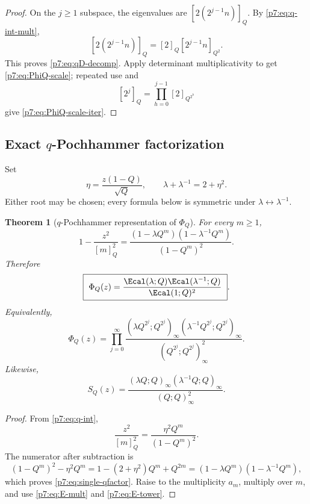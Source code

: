 \documentclass[11pt]{article}
\numberwithin{equation}{section}
\newtheorem{theorem}{Theorem}[section]
\theoremstyle{definition}
\theoremstyle{remark}
\begin{document}
\begin{proof}
On the $j\ge1$ subspace, the eigenvalues are $[2(2^{j-1}n)]_Q$.  By \cref{p7:eq:q-int-mult},
\[
 [2(2^{j-1}n)]_Q=[2]_Q[2^{j-1}n]_{Q^2}.
\]
This proves \cref{p7:eq:qD-decomp}.  Apply determinant multiplicativity to get \cref{p7:eq:PhiQ-scale}; repeated use and
\[
 [2^j]_Q=\prod_{h=0}^{j-1}[2]_{Q^{2^h}}
\]
give \cref{p7:eq:PhiQ-scale-iter}.
\end{proof}

\subsection{Exact $q$-Pochhammer factorization}

Set
\begin{equation}\label{p7:eq:eta-lambda}
 \eta=\frac{z(1-Q)}{\sqrt Q},
 \qquad
 \lambda+\lambda^{-1}=2+\eta^2.
\end{equation}
Either root may be chosen; every formula below is symmetric under $\lambda\leftrightarrow\lambda^{-1}$.

\begin{theorem}[$q$-Pochhammer representation of $\Phi_Q$]\label{p7:thm:PhiQ-pch}
For every $m\ge1$,
\begin{equation}\label{p7:eq:single-qfactor}
 1-\frac{z^2}{[m]_Q^2}
 =\frac{(1-\lambda Q^m)(1-\lambda^{-1}Q^m)}{(1-Q^m)^2}.
\end{equation}
Therefore
\begin{equation}\label{p7:eq:PhiQ-E}
 \boxed{\ \Phi_Q(z)
 =\frac{\Ecal(\lambda;Q)\Ecal(\lambda^{-1};Q)}{\Ecal(1;Q)^2}\ }.
\end{equation}
Equivalently,
\begin{equation}\label{p7:eq:PhiQ-tower}
 \Phi_Q(z)=\prod_{j=0}^{\infty}
 \frac{(\lambda Q^{2^j};Q^{2^j})_\infty
       (\lambda^{-1}Q^{2^j};Q^{2^j})_\infty}
      {(Q^{2^j};Q^{2^j})_\infty^2}.
\end{equation}
Likewise,
\begin{equation}\label{p7:eq:SQ-pch}
 S_Q(z)=
 \frac{(\lambda Q;Q)_\infty(\lambda^{-1}Q;Q)_\infty}
      {(Q;Q)_\infty^2}.
\end{equation}
\end{theorem}

\begin{proof}
From \cref{p7:eq:q-int},
\[
 \frac{z^2}{[m]_Q^2}
 =\frac{\eta^2Q^m}{(1-Q^m)^2}.
\]
The numerator after subtraction is
\[
 (1-Q^m)^2-\eta^2Q^m
 =1-(2+\eta^2)Q^m+Q^{2m}
 =(1-\lambda Q^m)(1-\lambda^{-1}Q^m),
\]
which proves \cref{p7:eq:single-qfactor}.  Raise to the multiplicity $a_m$, multiply over $m$, and use \cref{p7:eq:E-mult} and \cref{p7:eq:E-tower}.
\end{proof}
\end{document}
